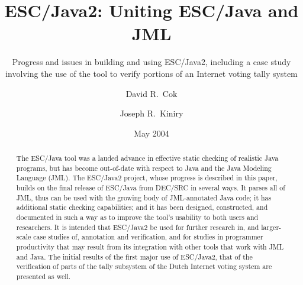 \documentclass{llncs}
\newif\ifpdf
\begin{document}
\pagestyle{empty}

\mainmatter


\title{ESC/Java2: Uniting ESC/Java and JML}
\subtitle{Progress and issues in building and using ESC/Java2,
including a case study involving the use of the tool
to verify portions of an Internet voting tally system}

\author{David R.~Cok \and Joseph R.~Kiniry}
\date{May 2004}

\maketitle

\newcommand{\myhref}[2]{\ifpdf\href{#1}{#2}\else\htmladdnormallinkfoot{#2}{#1}\fi}

\begin{abstract}
  The ESC/Java tool was a lauded advance in effective static checking
  of realistic Java programs, but has become out-of-date with respect
  to Java and the Java Modeling Language (JML).  The ESC/Java2
  project, whose progress is described in this paper, builds on the
  final release of ESC/Java from DEC/SRC in several ways.  It parses
  all of JML, thus can be used with the growing body of JML-annotated
  Java code; it has additional static checking capabilities; and it
  has been designed, constructed, and documented in such a way as to
  improve the tool's usability to both users and researchers.  It is
  intended that ESC/Java2 be used for further research in, and
  larger-scale case studies of, annotation and verification, and for
  studies in programmer productivity that may result from its
  integration with other tools that work with JML and Java.  The
  initial results of the first major use of ESC/Java2, that of the
  verification of parts of the tally subsystem of the Dutch Internet
  voting system are presented as well.
\end{abstract}
\end{document}
